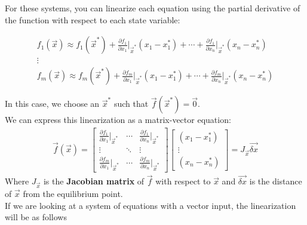For these systems, you can linearize each equation using the partial derivative of the function with respect to each state variable:
\begin{center}
    \begin{align*}
        f_1(\vec{x}) \approx f_1(\vec{x}^*) + \frac{\partial f_1}{\partial x_1} \bigg\rvert_{\vec{x}^*} (x_1 - x_1^*) + \cdots + \frac{\partial f_1}{\partial x_n} \bigg\rvert_{\vec{x}^*} (x_n - x_n^*) \\
        \vdots \\
        f_m(\vec{x}) \approx f_m(\vec{x}^*) + \frac{\partial f_m}{\partial x_1} \bigg\rvert_{\vec{x}^*} (x_1 - x_1^*) + \cdots + \frac{\partial f_m}{\partial x_n} \bigg\rvert_{\vec{x}^*} (x_n - x_n^*)
    \end{align*}
\end{center}
In this case, we choose an $\vec{x}^*$ such that $\vec{f}(\vec{x}^*) = \vec{0}$. \\
\newline
We can express this linearization as a matrix-vector equation:
\begin{align*}
    \vec{f}(\vec{x}) = \begin{bmatrix}
        \frac{\partial f_1}{\partial x_1} \bigg\rvert_{\vec{x}^*} & \cdots & \frac{\partial f_1}{\partial x_n} \bigg\rvert_{\vec{x}^*} \\
        \vdots & \ddots & \vdots \\
        \frac{\partial f_m}{\partial x_1} \bigg\rvert_{\vec{x}^*} & \cdots & \frac{\partial f_m}{\partial x_n} \bigg\rvert_{\vec{x}^*}
    \end{bmatrix} \begin{bmatrix}
        (x_1 - x_1^*) \\
        \vdots \\
        (x_n - x_n^*)
    \end{bmatrix} = \boxed{J_{\vec{x}} \vec{\delta x}}
\end{align*}
Where $J_{\vec{x}}$ is the \textbf{Jacobian matrix} of $\vec{f}$ with respect to $\vec{x}$ and $\vec{\delta x}$ is the distance of $\vec{x}$ from the equilibrium point. \\
\newline
If we are looking at a system of equations with a vector input, the linearization will be as follows
